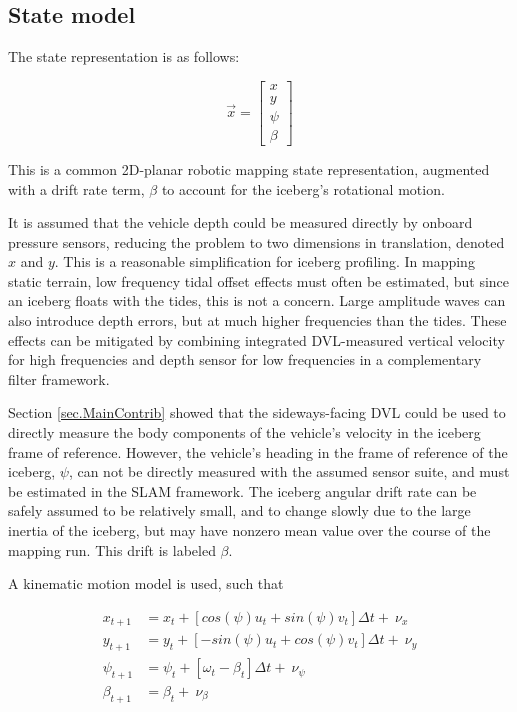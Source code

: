 \subsection{State model}

The state representation is as follows: 

\begin{equation}
\label{eq.state}
\vec{x}= \left[\begin{array}{c}
                     x \\ y \\ \psi \\ \beta 
                     \end{array}\right]
\end{equation}

This is a common 2D-planar robotic mapping state representation, augmented with a drift rate term, $\beta$ to account for the iceberg's rotational motion.

It is assumed that the vehicle depth could be measured directly by onboard pressure sensors, reducing the problem to two dimensions in translation, denoted $x$ and $y$. This is a reasonable simplification for iceberg profiling. In mapping static terrain, low frequency tidal offset effects must often be estimated, but since an iceberg floats with the tides, this is not a concern. Large amplitude waves can also introduce depth errors, but at much higher frequencies than the tides. These effects can be mitigated by combining integrated DVL-measured vertical velocity for high frequencies and depth sensor for low frequencies in a complementary filter framework.

Section \ref{sec.MainContrib} showed that the sideways-facing DVL could be used to directly measure the body components of the vehicle's velocity in the iceberg frame of reference. However, the vehicle's heading in the frame of reference of the iceberg, $\psi$, can not be directly measured with the assumed sensor suite, and must be estimated in the SLAM framework. The iceberg angular drift rate can be safely assumed to be relatively small, and to change slowly due to the large inertia of the iceberg, but may have nonzero mean value over the course of the mapping run. This drift is labeled $\beta$. 

A kinematic motion model is used, such that

\begin{align}
x_{t+1} &= x_t + \left[cos(\psi) u_t + sin(\psi)v_t\right]\Delta t +~ \nu_x\\
y_{t+1} &= y_t + \left[-sin(\psi) u_t + cos(\psi)v_t\right]\Delta t + ~\nu_y \\
\psi_{t+1}    &= \psi_{t} + \left[\omega_t- \beta_t \right] \Delta t + ~\nu_\psi\\
\beta_{t +1}   &= \beta_{t} + ~\nu_\beta
\end{align}

